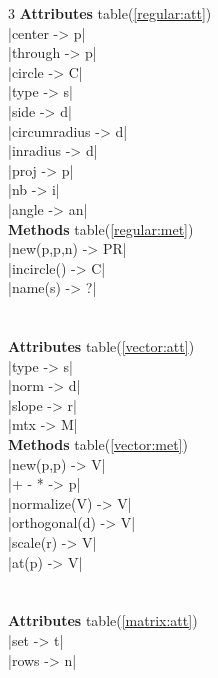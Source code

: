 \documentclass[DIV         = 14,
               fontsize    = 10,
               index       = totoc,
               twoside,
               cadre,
               headings    = small
               ]{tkz-doc}
\begin{document}
\begin{multicols}{3}
 \textbf{Attributes} table(\ref{regular:att}) \\
|center                    -> p|   \\
|through                   -> p|  \\
|circle                    -> C|  \\
|type                      -> s|  \\
|side                      -> d|   \\
|circumradius              -> d|   \\
|inradius                  -> d|   \\
|proj                      -> p|   \\
|nb                        -> i|   \\
|angle                    -> an|  \\
 \textbf{Methods} table(\ref{regular:met})  \\
|new(p,p,n)               -> PR|  \\
|incircle()                -> C|   \\
|name(s)                   -> ?|   \\
                                   \\
             \\
\textbf{Attributes} table(\ref{vector:att}) \\
|type                      -> s|   \\
|norm                      -> d|   \\
|slope                     -> r|   \\
|mtx                       -> M|   \\
\textbf{Methods} table(\ref{vector:met})  \\
|new(p,p)                  -> V|   \\
|+ - *                     -> p|   \\
|normalize(V)              -> V|   \\
|orthogonal(d)             -> V|   \\
|scale(r)                  -> V|   \\
|at(p)                     -> V|   \\
        \\
             \\
\textbf{Attributes} table(\ref{matrix:att})   \\
|set                       ->  t|  \\
|rows                      ->  n|  \\

\end{multicols}
\end{document}
